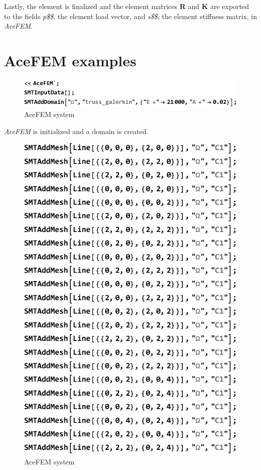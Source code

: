 Lastly, the element is finalized and the element matrices \textbf{R} and \textbf{K} are exported to the fields \textit{p\$\$}, the element load vector, and \textit{s\$\$}, the element stiffness matrix, in \textit{AceFEM}.

\newpage
\section{AceFEM examples}

\begin{figure}[htb]
	\includegraphics{figures/acefem_input_0}
	\caption{AceFEM system}
	\label{fig:AceFEM First Steps}
\end{figure}

\textit{AceFEM} is initialized and a domain is created. 

\begin{figure}[htb]
	\includegraphics{figures/acefem_input_1}
	\caption{AceFEM system}
	\label{fig:Meshing}
\end{figure}

